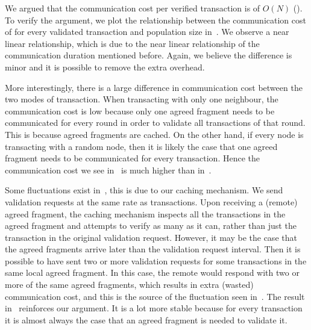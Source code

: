 We argued that the communication cost per verified transaction is of $O(N)$ ().
To verify the argument, we plot the relationship between the communication cost of for every validated transaction and population size in~.
We observe a near linear relationship, which is due to the near linear relationship of the communication duration mentioned before.
Again, we believe the difference is minor and it is possible to remove the extra overhead.

More interestingly, there is a large difference in communication cost between the two modes of transaction.
When transacting with only one neighbour, the communication cost is low because only one agreed fragment needs to be communicated for every round in order to validate all transactions of that round.
This is because agreed fragments are cached.
On the other hand,
if every node is transacting with a random node, then it is likely the case that one agreed fragment needs to be communicated for every transaction.
Hence the communication cost we see in~ is much higher than in~.

Some fluctuations exist in~, this is due to our caching mechanism.
We send validation requests at the same rate as transactions.
Upon receiving a (remote) agreed fragment, the caching mechanism inspects all the transactions in the agreed fragment and attempts to verify as many as it can,
rather than just the transaction in the original validation request.
However, it may be the case that the agreed fragments arrive later than the validation request interval.
Then it is possible to have sent two or more validation requests for some transactions in the same local agreed fragment.
In this case, the remote would respond with two or more of the same agreed fragments,
which results in extra (wasted) communication cost, and this is the source of the fluctuation seen in~.
The result in~ reinforces our argument.
It is a lot more stable because for every transaction it is almost always the case that an agreed fragment is needed to validate it.

